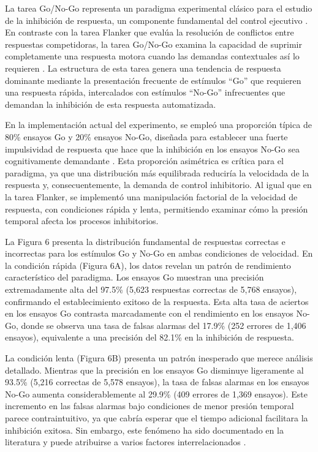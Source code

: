\documentclass[
  spanish,
  10pt,
]{article}
\begin{document}
La tarea Go/No-Go representa un paradigma experimental clásico para el
estudio de la inhibición de respuesta, un componente fundamental del
control ejecutivo \cite{Donders1969}. En contraste con la tarea Flanker
que evalúa la resolución de conflictos entre respuestas competidoras, la
tarea Go/No-Go examina la capacidad de suprimir completamente una
respuesta motora cuando las demandas contextuales así lo requieren
\cite{Verbruggen2019}. La estructura de esta tarea genera una tendencia
de respuesta dominante mediante la presentación frecuente de estímulos
``Go'' que requieren una respuesta rápida, intercalados con estímulos
``No-Go'' infrecuentes que demandan la inhibición de esta respuesta
automatizada.

En la implementación actual del experimento, se empleó una proporción
típica de 80\% ensayos Go y 20\% ensayos No-Go, diseñada para establecer
una fuerte impulsividad de respuesta que hace que la inhibición en los
ensayos No-Go sea cognitivamente demandante \cite{Wessel2018}. Esta
proporción asimétrica es crítica para el paradigma, ya que una
distribución más equilibrada reduciría la velocidada de la respuesta y,
consecuentemente, la demanda de control inhibitorio. Al igual que en la
tarea Flanker, se implementó una manipulación factorial de la velocidad
de respuesta, con condiciones rápida y lenta, permitiendo examinar cómo
la presión temporal afecta los procesos inhibitorios.

La Figura 6 presenta la distribución fundamental de respuestas correctas
e incorrectas para los estímulos Go y No-Go en ambas condiciones de
velocidad. En la condición rápida (Figura 6A), los datos revelan un
patrón de rendimiento característico del paradigma. Los ensayos Go
muestran una precisión extremadamente alta del 97.5\% (5,623 respuestas
correctas de 5,768 ensayos), confirmando el establecimiento exitoso de
la respuesta. Esta alta tasa de aciertos en los ensayos Go contrasta
marcadamente con el rendimiento en los ensayos No-Go, donde se observa
una tasa de falsas alarmas del 17.9\% (252 errores de 1,406 ensayos),
equivalente a una precisión del 82.1\% en la inhibición de respuesta.

La condición lenta (Figura 6B) presenta un patrón inesperado que merece
análisis detallado. Mientras que la precisión en los ensayos Go
disminuye ligeramente al 93.5\% (5,216 correctas de 5,578 ensayos), la
tasa de falsas alarmas en los ensayos No-Go aumenta considerablemente al
29.9\% (409 errores de 1,369 ensayos). Este incremento en las falsas
alarmas bajo condiciones de menor presión temporal parece
contraintuitivo, ya que cabría esperar que el tiempo adicional
facilitara la inhibición exitosa. Sin embargo, este fenómeno ha sido
documentado en la literatura y puede atribuirse a varios factores
interrelacionados \cite{Littman2017}.
\end{document}
